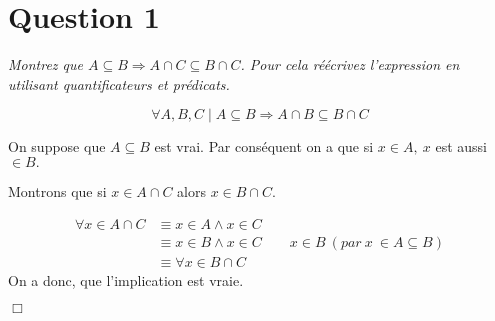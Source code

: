 \section*{Question 1}
\emph{Montrez que \( A \subseteq B \Rightarrow A \cap C \subseteq B \cap C\). Pour cela réécrivez l’expression en utilisant quantificateurs et prédicats.}


\[\forall A,B,C \mid A \subseteq B \Rightarrow A \cap B \subseteq B \cap C\]

\bigskip
On suppose que $A \subseteq B$ est vrai. Par conséquent on a que si $x \in A,\ x$ est aussi $\in B.$
	
Montrons que si $x \in A \cap C$ alors $x \in B \cap C$.

\begin{align*}
	\forall x \in A \cap C &\equiv x \in A \wedge x \in C\\
	&\equiv x \in B \wedge x \in C \qquad x \in B\ (par\ x\ \in A \subseteq B)\\
	&\equiv \forall x \in B \cap C
\end{align*}
\smallskip
On a donc, que l'implication est vraie.
\begin{flushright}
	$\Box$
\end{flushright}